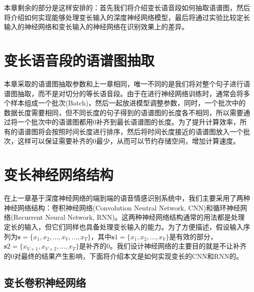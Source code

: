 本章剩余的部分是这样安排的：首先我们将介绍变长语音段如何抽取语谱图，然后将介绍如何实现能够处理变长输入的深度神经网络模型，最后将通过实验比较定长输入的神经网络和变长输入的神经网络在识别效果上的差异。

\section{变长语音段的语谱图抽取}

本章采取的语谱图抽取参数和上一章相同，唯一不同的是我们将对整个句子进行语谱图抽取，而不是对切分的等长语音段。由于在进行神经网络训练时，通常会将多个样本组成一个批次(Batch)，然后一起放进模型调整参数，同时，一个批次中的数据长度需要相同，但不同长度的句子得到的语谱图的长度各不相同，所以需要通过将一个批次中的语谱图都用0补齐到最长语谱图的长度。为了提升计算效率，所有的语谱图将会按照时间长度进行排序，然后将时间长度接近的语谱图放入一个批次，这样可以保证需要补齐的0最少，从而可以节约存储空间，增加计算速度。

\section{变长神经网络结构}
\label{sec:var_len_nn}

在上一章基于深度神经网络的端到端的语音情感识别系统中，我们主要采用了两种神经网络结构：卷积神经网络(Convolution Neutral Network, CNN)和循环神经网络(Recurrent Neural Network, RNN)。这两种神经网络结构通常的用法都是处理定长的输入，但它们同样也具备处理变长输入的能力。为了方便描述，假设输入序列为$\mathbf{s} = \{x_1, x_2,...,x_V,...,x_T\}$，其中$\mathbf{s}1 = \{x_1, x_2,...,x_V\}$是有效的部分，$\mathbf{s}2 = \{x_{V+1}, x_{V+2},...,x_T\}$是补齐的0。我们设计神经网络的主要目的就是不让补齐的0对最终的结果产生影响，下面将介绍本文是如何实现变长的CNN和RNN的。

\subsection{变长卷积神经网络}
\label{ssec:var_len_cnn}

